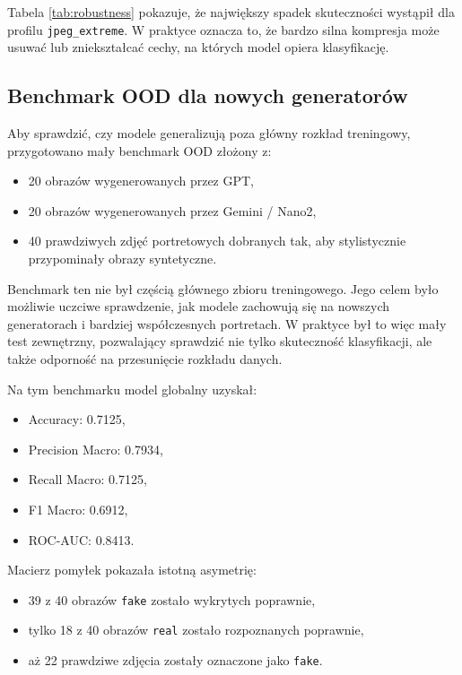 Tabela \ref{tab:robustness} pokazuje, że największy spadek skuteczności wystąpił dla profilu \texttt{jpeg\_extreme}. W praktyce oznacza to, że bardzo silna kompresja może usuwać lub zniekształcać cechy, na których model opiera klasyfikację.

\subsection{Benchmark OOD dla nowych generatorów}

Aby sprawdzić, czy modele generalizują poza główny rozkład treningowy, przygotowano mały benchmark OOD złożony z:

\begin{itemize}
    \item 20 obrazów wygenerowanych przez GPT,
    \item 20 obrazów wygenerowanych przez Gemini / Nano2,
    \item 40 prawdziwych zdjęć portretowych dobranych tak, aby stylistycznie przypominały obrazy syntetyczne.
\end{itemize}

Benchmark ten nie był częścią głównego zbioru treningowego. Jego celem było możliwie uczciwe sprawdzenie, jak modele zachowują się na nowszych generatorach i bardziej współczesnych portretach. W praktyce był to więc mały test zewnętrzny, pozwalający sprawdzić nie tylko skuteczność klasyfikacji, ale także odporność na przesunięcie rozkładu danych.

Na tym benchmarku model globalny uzyskał:

\begin{itemize}
    \item Accuracy: 0.7125,
    \item Precision Macro: 0.7934,
    \item Recall Macro: 0.7125,
    \item F1 Macro: 0.6912,
    \item ROC-AUC: 0.8413.
\end{itemize}

Macierz pomyłek pokazała istotną asymetrię:

\begin{itemize}
    \item 39 z 40 obrazów \texttt{fake} zostało wykrytych poprawnie,
    \item tylko 18 z 40 obrazów \texttt{real} zostało rozpoznanych poprawnie,
    \item aż 22 prawdziwe zdjęcia zostały oznaczone jako \texttt{fake}.
\end{itemize}

